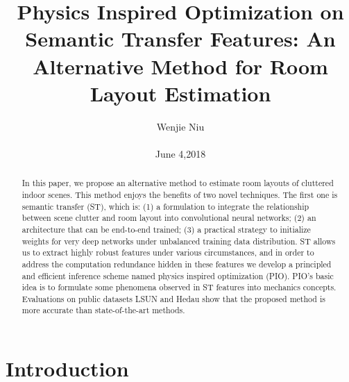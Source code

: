 \documentclass[10pt,twocolumn,letterpaper]{article}
\begin{document}
\title{Physics Inspired Optimization on Semantic Transfer Features: An Alternative Method for Room Layout Estimation}

\author{Wenjie Niu\\\\ June 4,2018}

\maketitle

\begin{abstract}
  In this paper, we propose an alternative method to estimate
room layouts of cluttered indoor scenes. This method
enjoys the benefits of two novel techniques. The first one
is semantic transfer (ST), which is: (1) a formulation to
integrate the relationship between scene clutter and room
layout into convolutional neural networks; (2) an architecture
that can be end-to-end trained; (3) a practical strategy
to initialize weights for very deep networks under unbalanced
training data distribution. ST allows us to extract
highly robust features under various circumstances,
and in order to address the computation redundance hidden
in these features we develop a principled and efficient inference
scheme named physics inspired optimization (PIO).
PIO’s basic idea is to formulate some phenomena observed
in ST features into mechanics concepts. Evaluations on
public datasets LSUN and Hedau show that the proposed
method is more accurate than state-of-the-art methods.~\cite{Zhao_2017_CVPR}
\end{abstract}

\section{Introduction}
\end{document}
